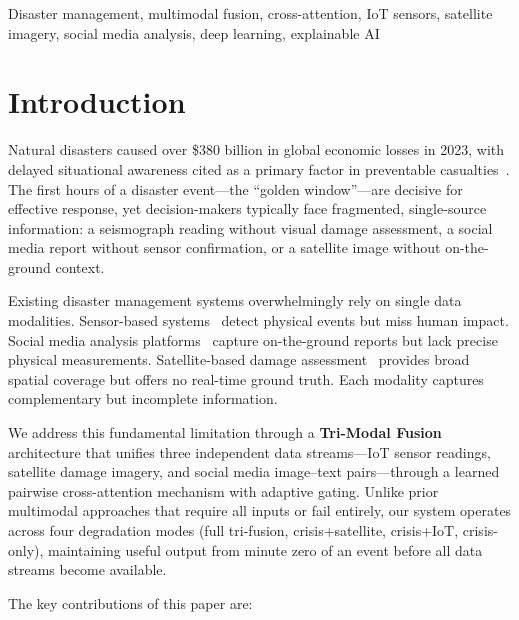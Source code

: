 \documentclass[journal]{IEEEtran}
\begin{document}
\begin{IEEEkeywords}
Disaster management, multimodal fusion, cross-attention, IoT sensors, satellite imagery, social media analysis, deep learning, explainable AI
\end{IEEEkeywords}

\section{Introduction}

Natural disasters caused over \$380 billion in global economic losses in 2023, with delayed situational awareness cited as a primary factor in preventable casualties~\cite{cred2023}. The first hours of a disaster event---the ``golden window''---are decisive for effective response, yet decision-makers typically face fragmented, single-source information: a seismograph reading without visual damage assessment, a social media report without sensor confirmation, or a satellite image without on-the-ground context.

Existing disaster management systems overwhelmingly rely on single data modalities. Sensor-based systems~\cite{sakaki2010earthquake} detect physical events but miss human impact. Social media analysis platforms~\cite{alam2018crisismmd,imran2015processing} capture on-the-ground reports but lack precise physical measurements. Satellite-based damage assessment~\cite{gupta2019xbd} provides broad spatial coverage but offers no real-time ground truth. Each modality captures complementary but incomplete information.

We address this fundamental limitation through a \textbf{Tri-Modal Fusion} architecture that unifies three independent data streams---IoT sensor readings, satellite damage imagery, and social media image--text pairs---through a learned pairwise cross-attention mechanism with adaptive gating. Unlike prior multimodal approaches that require all inputs or fail entirely, our system operates across four degradation modes (full tri-fusion, crisis+satellite, crisis+IoT, crisis-only), maintaining useful output from minute zero of an event before all data streams become available.

The key contributions of this paper are:
\end{document}

